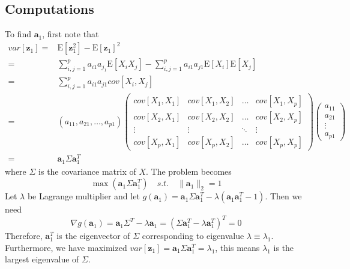 \documentclass[../main.tex]{subfiles}
\begin{document}
        \subsection{Computations}
            To find $\mathbf{a}_1$, first note that
            \begin{align*}
                var[\textbf{z}_1]=&\mathrm{E}[\mathbf{z}_1^2]-\mathrm{E}[\mathbf{z}_1]^2\\
                                =&\sum_{i,j=1}^pa_{i1}a_{j_1}\mathrm{E}[X_iX_j]-\sum_{i,j=1}^pa_{i1}a_{j1}\mathrm{E}[X_i]\mathrm{E}[X_j]\\
                                =&\sum_{i,j=1}^pa_{i1}a_{j1}cov[X_i,X_j]\\
                                =&(a_{11},a_{21},\dots,a_{p1})
                                \begin{pmatrix}
                                    cov[X_1,X_1] & cov[X_1,X_2] & \dots & cov[X_1,X_p]\\
                                    cov[X_2,X_1] & cov[X_2,X_2] & \dots & cov[X_2,X_p]\\
                                    \vdots & \vdots & \ddots & \vdots \\
                                    cov[X_p,X_1] & cov[X_p,X_2] & \dots & cov[X_p,X_p]
                                \end{pmatrix}
                                \begin{pmatrix}
                                    a_{11} \\ a_{21} \\ \vdots \\ a_{p1}
                                \end{pmatrix}\\
                                =&\mathbf{a}_1\Sigma\mathbf{a}_1^T
            \end{align*}
            where $\Sigma$ is the covariance matrix of $X$. The problem becomes
            \[
                \max(\mathbf{a}_1\Sigma\mathbf{a}_1^T) \quad s.t.\quad \|\mathbf{a}_1\|_2=1
            \]
            Let $\lambda$ be Lagrange multiplier and let $g(\mathbf{a}_1)=\mathbf{a}_1\Sigma\mathbf{a}_1^T-\lambda(\mathbf{a}_1\mathbf{a}_1^T-1)$. Then we need
            \[
                \nabla g(\mathbf{a}_1)=\mathbf{a}_1\Sigma^T-\lambda\mathbf{a}_1=(\Sigma\mathbf{a}_1^T-\lambda\mathbf{a}_1^T)^T=0
            \]
            Therefore, $\mathbf{a}_1^T$ is the eigenvector of $\Sigma$ corresponding to eigenvalue $\lambda\equiv\lambda_1$. Furthermore, we have maximized $var[\mathbf{z}_1]=\mathbf{a}_1\Sigma\mathbf{a}_1^T=\lambda_1$, this means $\lambda_1$ is the largest eigenvalue of $\Sigma$.
            
\end{document}
